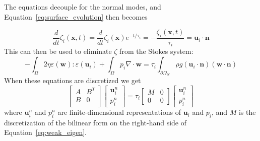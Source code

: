\documentclass[preprint,12pt,authoryear]{elsarticle}
\begin{document}
The equations decouple for the normal modes, and Equation~\eqref{eq:surface_evolution} then becomes

\begin{equation}
\frac {d}{d t} \zeta_i(\mathbf{x},t) = \frac{d}{dt} \zeta_i(\mathbf{x})e^{-t/\tau_i} = -\frac{\zeta_i(\mathbf{x},t)}{\tau_i} = \mathbf{u}_i \cdot \mathbf{n}
\end{equation}
This can then be used to eliminate $\zeta$ from the Stokes system:
\begin{equation}
-\int_\Omega 2 \eta \varepsilon( \mathbf{w} ) \colon \varepsilon( \mathbf{u}_i ) + \int_\Omega p_i \nabla \cdot \mathbf{w} 
= \tau_i \int_{\partial \Omega_N} \rho g (\mathbf{u}_i \cdot \mathbf{n} ) (\mathbf{w} \cdot \mathbf{n})
\label{eq:weak_eigen}
\end{equation}
When these equations are discretized \citep[e.g.][]{kronbichler2012high} we get
\begin{equation}
\begin{bmatrix}
A & B^T \\
B & 0 \\
\end{bmatrix}
\begin{bmatrix}
\mathbf{u}^n_i \\
p^n_i
\end{bmatrix}
=
\tau_i
\begin{bmatrix}
M & 0 \\
0 & 0
\end{bmatrix}
\begin{bmatrix}
\mathbf{u}^n_i \\
p^n_i
\end{bmatrix}
\label{eq:generalized_eigenvalue}
\end{equation}
where $\mathbf{u}^n_i$ and $p^n_i$ are finite-dimensional representations of $\mathbf{u}_i$ and $p_i$,
and $M$ is the discretization of the bilinear form on the right-hand side of Equation~\eqref{eq:weak_eigen}.
\end{document}
